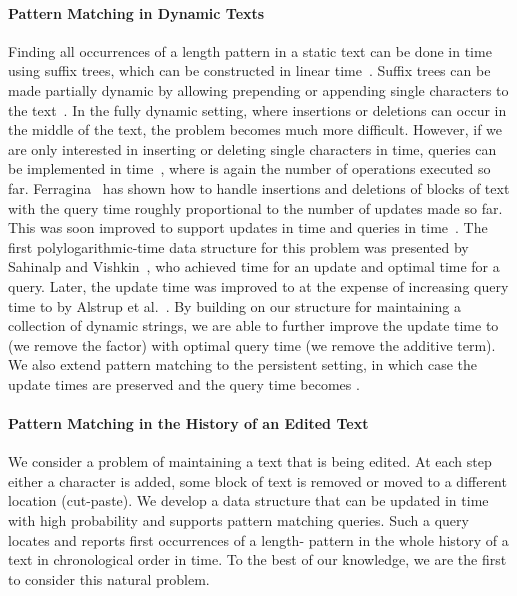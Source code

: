 \documentclass[a4paper]{article}
\theoremstyle{remark}
\begin{document}
\paragraph{Pattern Matching in Dynamic Texts}
Finding all  occurrences of a length  pattern in a static text can be done in  time
using suffix trees, which can be constructed in linear time~\cite{McCreight:1976,SuffixTree}.
Suffix trees can be made partially dynamic by allowing prepending or appending single characters
to the text~\cite{onlinesuffix}. In the fully dynamic setting, where insertions or deletions can
occur in the middle of the text, the problem becomes much more difficult.
However, if we are only interested in inserting or deleting single characters in  time,
queries can be implemented in  time~\cite{Gu:1994},
where  is again the number of operations executed so far.
Ferragina~\cite{Ferragina:1997} has shown how to handle insertions and deletions of blocks of text with the query
time roughly proportional to the number of updates made so far. This was soon improved to support
updates in  time and queries in  time~\cite{DBLP:journals/siamcomp/FerraginaG98}.
The first polylogarithmic-time data structure for this problem was presented by Sahinalp and Vishkin~\cite{Sahinalp:1996}, who achieved  time for an update and optimal
 time for a query. Later, the update time was improved to
 at the expense of increasing query time to
 by Alstrup et al.~\cite{Alstrup}. By building on our structure
for maintaining a collection of dynamic strings, we are able to further improve the update time
to  (we remove the  factor) with optimal query time (we remove the  additive term).
We also extend pattern matching to the persistent setting, in which case the update times are preserved
and the query time becomes .

\paragraph{Pattern Matching in the History of an Edited Text}
We consider a problem of maintaining a text that is being edited.
At each step either a character is added, some block of text is removed or moved to a different location (cut-paste).
We develop a data structure that can be updated in  time with high probability and
supports pattern matching queries.
Such a query locates and reports first  occurrences of a length- pattern in the whole history of a text in chronological
order in  time.
To the best of our knowledge, we are the first to consider this natural problem.
\end{document}
